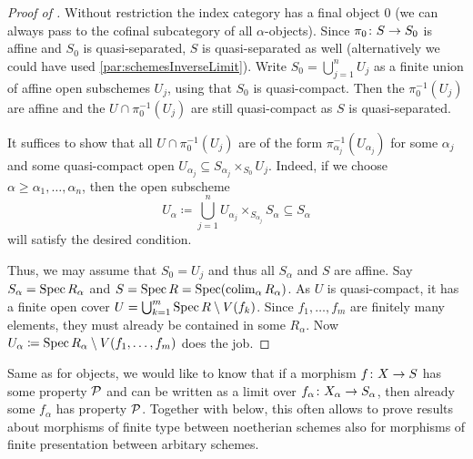 \begin{proof}[Proof of ]
	Without restriction the index category has a final object $0$ (we can always pass to the cofinal subcategory of all $\alpha$-objects). Since $\pi_0\colon S\morphism S_0$ is affine and $S_0$ is quasi-separated, $S$ is quasi-separated as well (alternatively we could have used \cref{par:schemesInverseLimit}). Write $S_0=\bigcup_{j=1}^nU_j$ as a finite union of affine open subschemes $U_j$, using that $S_0$ is quasi-compact. Then the $\pi_0^{-1}(U_j)$ are affine and the $U\cap \pi_0^{-1}(U_j)$ are still quasi-compact as $S$ is quasi-separated.
	
	It suffices to show that all $U\cap \pi_0^{-1}(U_j)$ are of the form $\pi_{\alpha_j}^{-1}(U_{\alpha_j})$ for some $\alpha_j$ and some quasi-compact open $U_{\alpha_j}\subseteq S_{\alpha_j}\times_{S_0}U_j$. Indeed, if we choose $\alpha\geq \alpha_1,\dotsc,\alpha_n$, then the open subscheme
	\begin{equation*}
	U_\alpha\coloneqq \bigcup_{j=1}^nU_{\alpha_j}\times_{S_{\alpha_j}}S_\alpha\subseteq S_\alpha
	\end{equation*}
	will satisfy the desired condition.
	
	Thus, we may assume that $S_0=U_j$ and thus all $S_\alpha$ and $S$ are affine. Say $S_\alpha=\operatorname{Spec} R_\alpha$ and $S=\operatorname{Spec} R=\operatorname{Spec}(\operatorname*{colim}_\alpha R_\alpha)$. As $U$ is quasi-compact, it has a finite open cover $U=\bigcup_{k=1}^m\operatorname{Spec} R\setminus V(f_k)$. Since $f_1,\dotsc,f_m$ are finitely many elements, they must already be contained in some $R_\alpha$. Now $U_\alpha\coloneqq \operatorname{Spec} R_\alpha\setminus V(f_1,\dotsc,f_m)$ does the job.
\end{proof}
\label{par:descendingMorphisms}
Same as for objects, we would like to know that if a morphism $f\colon X\morphism S$ has some property $\mathcal{P}$ and can be written as a limit over $f_\alpha\colon X_\alpha\morphism S_\alpha$, then already some $f_\alpha$ has property $\mathcal{P}$. Together with  below, this often allows to prove results about morphisms of finite type between noetherian schemes also for morphisms of finite presentation between arbitary schemes.
